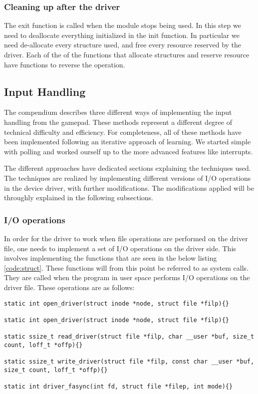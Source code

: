\subsubsection{Cleaning up after the driver}
The exit function is called when the module stops being used. In this step we need to deallocate everything initialized in the init function. In particular we need de-allocate every structure used, and free every resource reserved by the driver. Each of the of the functions that allocate structures and reserve resource have functions to reverse the operation. 






\subsection{Input Handling}
The compendium describes three different ways of implementing the input handling from the gamepad. These methods represent a different degree of technical difficulty and efficiency. For completeness, all of these methods have been implemented following an iterative approach of learning. We started simple with polling and worked ourself up to the more advanced features like interrupts.

The different approaches have dedicated sections explaining the techniques used. The techniques are realized by implementing different versions of I/O operations in the device driver, with further modifications. The modifications applied will be throughly explained in the following subsections. 


\subsubsection{I/O operations}
In order for the driver to work when file operations are performed on the driver file, one needs to implement a set of I/O operations on the driver side. This involves implementing the functions that are seen in the below listing \ref{code:struct}. These functions will from this point be referred to as system calls. They are called when the program in user space performs I/O operations on the driver file. These operations are as follows: 

\begin{lstlisting}[caption=System calls, label=code:func]
static int open_driver(struct inode *node, struct file *filp){}

static int open_driver(struct inode *node, struct file *filp){}

static ssize_t read_driver(struct file *filp, char __user *buf, size_t count, loff_t *offp){}

static ssize_t write_driver(struct file *filp, const char __user *buf, size_t count, loff_t *offp){}

static int driver_fasync(int fd, struct file *filep, int mode){}
\end{lstlisting}




